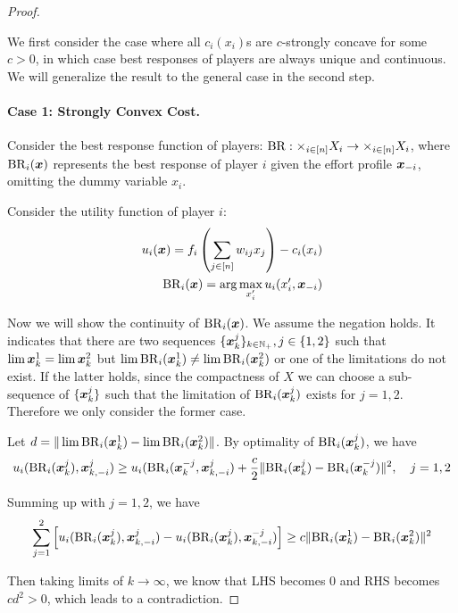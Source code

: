 \begin{proof}
\label{prf:thm:NE:exist}

We first consider the case where all $c_i(x_i)$s are $c$-strongly concave for some $c>0$, in which case best responses of players are always unique and continuous. We will generalize the result to the general case in the second step.

\paragraph{Case 1: Strongly Convex Cost.}
Consider the best response function of players: $\mathrm{BR}:
\times_{i\in[n]} X_i \to \times_{i\in[n]} X_i$, where $\mathrm{BR}_i({\bm{x}})$ represents the best response of player $i$ given the effort profile ${\bm{x}}_{-i}$, omitting the dummy variable $x_i$. 

Consider the utility function of player $i$:
\begin{align*}
    u_i({\bm{x}}) = f_i\left(\sum_{j\in[n]} w_{ij}x_j\right) - c_i(x_i)
    \\
    \mathrm{BR}_i({\bm{x}}) = \arg\max_{x'_i} u_i(x'_i, {\bm{x}}_{-i})
\end{align*}

Now we will show the continuity of $\mathrm{BR}_i({\bm{x}})$. We assume the negation holds. It indicates that there are two sequences $\{{\bm{x}}^j_k\}_{k\in\mathbb{N}_+}, j\in\{1,2\}$ such that $\lim {\bm{x}}^1_k = \lim {\bm{x}}^2_k$ but $\lim \mathrm{BR}_i({\bm{x}}^1_k) \ne \lim \mathrm{BR}_i({\bm{x}}^2_k)$ or one of the limitations do not exist. If the latter holds, since the compactness of $X$ we can choose a sub-sequence of $\{{\bm{x}}^j_k\}$ such that the limitation of $\mathrm{BR}_i({\bm{x}}^j_k)$ exists for $j=1,2$. Therefore we only consider the former case.

Let $d = \| \lim \mathrm{BR}_i({\bm{x}}^1_k) - \lim \mathrm{BR}_i({\bm{x}}^2_k) \|$. 
By optimality of $\mathrm{BR}_i({\bm{x}}^j_k)$, we have
\begin{align*}
    u_i(\mathrm{BR}_i({\bm{x}}^j_k), {\bm{x}}^j_{k,-i}) \ge u_i(\mathrm{BR}_i({\bm{x}}^{-j}_k, {\bm{x}}^j_{k,-i}) + \frac{c}{2} \| \mathrm{BR}_i({\bm{x}}^j_k) - \mathrm{BR}_i({\bm{x}}^{-j}_k)\|^2,\quad j = 1,2
\end{align*}

Summing up with $j=1,2$, we have
\begin{align*}
    \sum_{j=1}^2 \left[ u_i(\mathrm{BR}_i({\bm{x}}^j_k), {\bm{x}}^j_{k,-i}) - u_i(\mathrm{BR}_i({\bm{x}}^{j}_k), {\bm{x}}^{-j}_{k,-i}) \right] \ge c \| \mathrm{BR}_i({\bm{x}}^1_k) - \mathrm{BR}_i({\bm{x}}^2_k)\|^2
\end{align*}

Then taking limits of $k\to \infty$, we know that LHS becomes $0$ and RHS becomes $c d^2 > 0$, which leads to a contradiction.



\end{proof}
